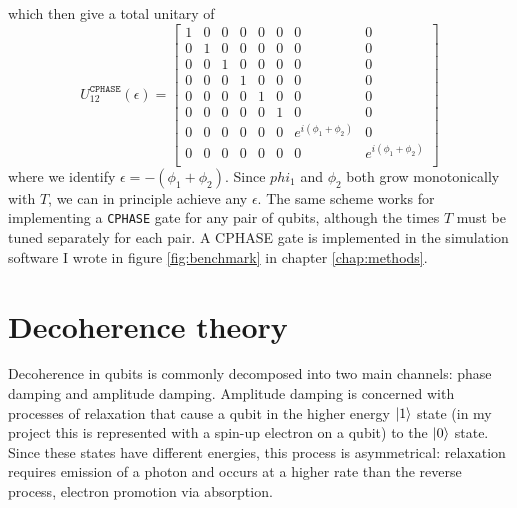 \documentclass{report}
\begin{document}
\begin{appendices}
\begin{equation*}
\end{equation*}
which then give a total unitary of 
\begin{equation*}
     U^{\texttt{CPHASE}}_{12}(\epsilon) = 
     \begin{bmatrix}
        1 & 0 & 0 & 0 & 0 & 0 & 0 & 0\\
        0 & 1 & 0 & 0 & 0 & 0 & 0 & 0\\
        0 & 0 & 1 & 0 & 0 & 0 & 0 & 0\\
        0 & 0 & 0 & 1 & 0 & 0 & 0 & 0\\
        0 & 0 & 0 & 0 & 1 & 0 & 0 & 0\\
        0 & 0 & 0 & 0 & 0 & 1 & 0 & 0\\
        0 & 0 & 0 & 0 & 0 & 0 & e^{i(\phi_1 + \phi_2)} & 0\\
        0 & 0 & 0 & 0 & 0 & 0 & 0 & e^{i(\phi_1 + \phi_2)}\\
    \end{bmatrix}
\end{equation*} where we identify $\epsilon = -(\phi_1 + \phi_2)$. Since $phi_1$ and $\phi_2$ both grow monotonically with $T$, we can in principle achieve any $\epsilon$. The same scheme works for implementing a \texttt{CPHASE} gate for any pair of qubits, although the times $T$ must be tuned separately for each pair. A CPHASE gate is implemented in the simulation software I wrote in figure \ref{fig:benchmark} in chapter \ref{chap:methods}.

\chapter{Decoherence theory}\label{appendix:decoherence}
Decoherence in qubits is commonly decomposed into two main channels: phase damping and amplitude damping. Amplitude damping is concerned with processes of relaxation that cause a qubit in the higher energy $\ket{1}$ state (in my project this is represented with a spin-up electron on a qubit) to the $\ket{0}$ state. Since these states have different energies, this process is asymmetrical: relaxation requires emission of a photon and occurs at a higher rate than the reverse process\cite{Loss2022}, electron promotion via absorption. 


\end{appendices}
\end{document}
